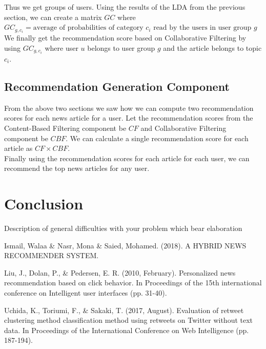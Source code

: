 \documentclass{article}
\begin{document}
Thus we get groups of users. Using the results of the LDA from the previous section, we can create a matrix $GC$ where $GC_{g, c_i} = \textrm{average of probabilities of category $c_i$ read by the users in user group $g$}$ \\

We finally get the recommendation score based on Collaborative Filtering by using $GC_{g, c_i}$ where user $u$ belongs to user group $g$ and the article belongs to topic $c_i$.
\subsection{Recommendation Generation Component}

From the above two sections we saw how we can compute two recommendation scores for each news article for a user. Let the recommendation scores from the Content-Based Filtering component be $CF$ and Collaborative Filtering component be $CBF$. We can calculate a single recommendation score for each article as $CF \times CBF$. \\

Finally using the recommendation scores for each article for each user, we can recommend the top news articles for any user. \\


\section{Conclusion}

{Description of general difficulties with your problem which bear elaboration
}

\begin{thebibliography}{9}

 Ismail, Walaa \& Nasr, Mona \& Saied, Mohamed. (2018). A HYBRID NEWS RECOMMENDER SYSTEM.

 Liu, J., Dolan, P., & Pedersen, E. R. (2010, February). Personalized news recommendation based on click behavior. In Proceedings of the 15th international conference on Intelligent user interfaces (pp. 31-40).

 Uchida, K., Toriumi, F., & Sakaki, T. (2017, August). Evaluation of retweet clustering method classification method using retweets on Twitter without text data. In Proceedings of the International Conference on Web Intelligence (pp. 187-194).

\end{thebibliography}
\end{document}
